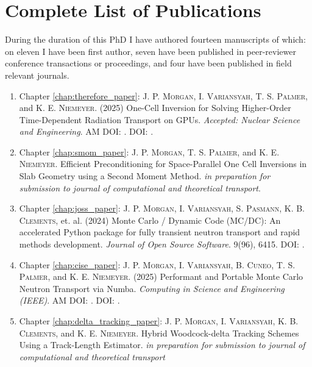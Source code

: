 \chapter{Complete List of Publications}
\label{chap:listopusb}

During the duration of this PhD I have authored fourteen manuscripts of which: on eleven I have been first author, seven have been published in peer-reviewer conference transactions or proceedings, and four have been published in field relevant journals.

\begin{enumerate}
    \item Chapter \ref{chap:therefore_paper}: \textsc{J. P. Morgan}, \textsc{I. Variansyah}, \textsc{T. S. Palmer}, and \textsc{K. E. Niemeyer}. (2025) One-Cell Inversion for Solving Higher-Order Time-Dependent Radiation Transport on GPUs. \emph{Accepted: Nuclear Science and Engineering}. AM DOI: . DOI: .

    \item Chapter \ref{chap:smom_paper}: \textsc{J. P. Morgan},  \textsc{T. S. Palmer}, and \textsc{K. E. Niemeyer}. Efficient Preconditioning for Space-Parallel One Cell Inversions in Slab Geometry using a Second Moment Method. \emph{in preparation for submission to journal of computational and theoretical transport}.

    \item Chapter \ref{chap:joss_paper}: \textsc{J. P. Morgan}, \textsc{I. Variansyah}, \textsc{S. Pasmann}, \textsc{K. B. Clements}, et. al. (2024) Monte Carlo / Dynamic Code (MC/DC): An accelerated Python package for fully transient neutron transport and rapid methods development. \emph{Journal of Open Source Software}. 9(96), 6415. DOI: .

    \item Chapter \ref{chap:cise_paper}: \textsc{J. P. Morgan}, \textsc{I. Variansyah}, \textsc{B. Cuneo}, \textsc{T. S. Palmer}, and \textsc{K. E. Niemeyer}. (2025) Performant and Portable Monte Carlo Neutron Transport via Numba. \emph{Computing in Science and Engineering (IEEE)}. AM DOI: . DOI: .

    \item Chapter \ref{chap:delta_tracking_paper}: \textsc{J. P. Morgan}, \textsc{I. Variansyah}, \textsc{K. B. Clements}, and \textsc{K. E. Niemeyer}. Hybrid Woodcock-delta Tracking Schemes Using a Track-Length Estimator. \emph{in preparation for submission to journal of computational and theoretical transport}


\end{enumerate}
